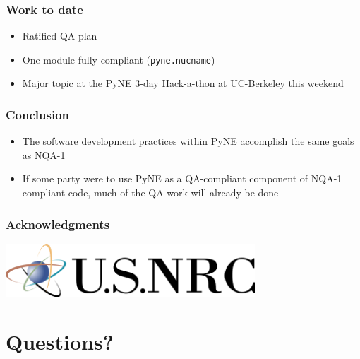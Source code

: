 \documentclass[12pt]{beamer}
\begin{document}
\begin{frame}
\frametitle{Work to date}

\begin{itemize}
\item{Ratified QA plan}
\item{One module fully compliant (\texttt{pyne.nucname})}
\item{Major topic at the PyNE 3-day Hack-a-thon at UC-Berkeley this weekend}
\end{itemize}

\end{frame}
\begin{frame}
\frametitle{Conclusion}

\begin{itemize}
\item{The software development practices within PyNE accomplish the same goals as NQA-1}
\item{If some party were to use PyNE as a QA-compliant component of NQA-1 compliant code, much of the QA work will already be done}
\end{itemize}

\end{frame}
\begin{frame}[fragile]
\frametitle{Acknowledgments}

\includegraphics[height=2cm]{figures/NRClogo.png} \\

\end{frame}


\section*{Questions?}
\end{document}
